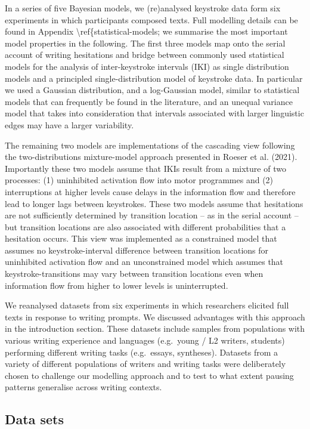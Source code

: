\documentclass[
  man,floatsintext]{apa7}
\begin{document}
In a series of five Bayesian models, we (re)analysed keystroke data form six experiments in which participants composed texts. Full modelling details can be found in Appendix \textbackslash ref\{statistical-models; we summarise the most important model properties in the following. The first three models map onto the serial account of writing hesitations and bridge between commonly used statistical models for the analysis of inter-keystroke intervals (IKI) as single distribution models and a principled single-distribution model of keystroke data. In particular we used a Gaussian distribution, and a log-Gaussian model, similar to statistical models that can frequently be found in the literature, and an unequal variance model that takes into consideration that intervals associated with larger linguistic edges may have a larger variability.

The remaining two models are implementations of the cascading view following the two-distributions mixture-model approach presented in Roeser et al. (2021). Importantly these two models assume that IKIs result from a mixture of two processes: (1) uninhibited activation flow into motor programmes and (2) interruptions at higher levels cause delays in the information flow and therefore lead to longer lags between keystrokes. These two models assume that hesitations are not sufficiently determined by transition location -- as in the serial account -- but transition locations are also associated with different probabilities that a hesitation occurs. This view was implemented as a constrained model that assumes no keystroke-interval difference between transition locations for uninhibited activation flow and an unconstrained model which assumes that keystroke-transitions may vary between transition locations even when information flow from higher to lower levels is uninterrupted.

We reanalysed datasets from six experiments in which researchers elicited full texts in response to writing prompts. We discussed advantages with this approach in the introduction section. These datasets include samples from populations with various writing experience and languages (e.g.~young / L2 writers, students) performing different writing tasks (e.g.~essays, syntheses). Datasets from a variety of different populations of writers and writing tasks were deliberately chosen to challenge our modelling approach and to test to what extent pausing patterns generalise across writing contexts.

\hypertarget{data-sets}{%
\subsection{Data sets}\label{data-sets}}
\end{document}
